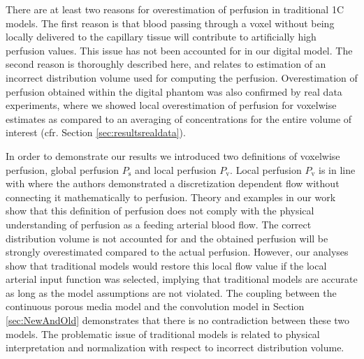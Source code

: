 \documentclass[final,5p,times,twocolumn]{elsarticle}
\begin{document}
	There are at least two reasons for overestimation of perfusion in traditional 1C models. The first reason is that blood passing through a voxel without being locally delivered to the capillary tissue will contribute to artificially high perfusion values. This issue has not been accounted for in our digital model. The second reason is thoroughly described here, and relates to estimation of an incorrect distribution volume used for computing the perfusion. 
	Overestimation of perfusion obtained within the digital phantom was also confirmed by real data experiments, where we showed local overestimation of perfusion for voxelwise estimates as compared to an averaging of concentrations for the entire volume of interest (cfr. Section \ref{sec:resultsrealdata}). 
	
	In order to demonstrate our results we introduced two definitions of voxelwise perfusion, global perfusion $P_{\mathrm{s}}$ and local perfusion $P_{\mathrm{v}}$. Local perfusion $P_{\mathrm{v}}$ is in line with \cite{Guibert2013} where the authors demonstrated a discretization dependent flow without connecting it mathematically to perfusion. Theory and examples in our work show that this definition of perfusion does not comply with the physical understanding of perfusion as a feeding arterial blood flow. The correct distribution volume is not accounted for and the obtained perfusion will be strongly overestimated compared to the actual perfusion. However, our analyses show that traditional models would restore this local flow value if the local arterial input function was selected, implying that traditional models are accurate as long as the model assumptions are not violated. The coupling between the continuous porous media model and the convolution model in Section \ref{sec:NewAndOld} demonstrates that there is no contradiction between these two models. The problematic issue of traditional models is related to physical interpretation and normalization with respect to incorrect distribution volume.
\end{document}
